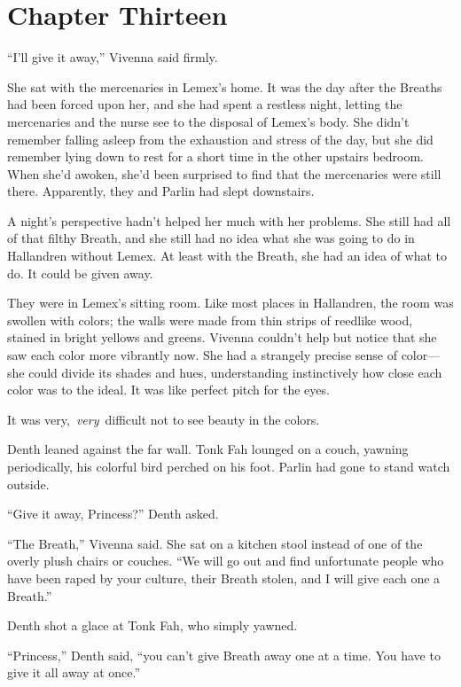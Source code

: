 \section{Chapter Thirteen}

“I’ll give it away,” Vivenna said firmly.

She sat with the mercenaries in Lemex’s home. It was the day after the Breaths had been forced upon her, and she had spent a restless night, letting the mercenaries and the nurse see to the disposal of Lemex’s body. She didn’t remember falling asleep from the exhaustion and stress of the day, but she did remember lying down to rest for a short time in the other upstairs bedroom. When she’d awoken, she’d been surprised to find that the mercenaries were still there. Apparently, they and Parlin had slept downstairs.

A night’s perspective hadn’t helped her much with her problems. She still had all of that filthy Breath, and she still had no idea what she was going to do in Hallandren without Lemex. At least with the Breath, she had an idea of what to do. It could be given away.

They were in Lemex’s sitting room. Like most places in Hallandren, the room was swollen with colors; the walls were made from thin strips of reedlike wood, stained in bright yellows and greens. Vivenna couldn’t help but notice that she saw each color more vibrantly now. She had a strangely precise sense of color—she could divide its shades and hues, understanding instinctively how close each color was to the ideal. It was like perfect pitch for the eyes.

It was very,~\textit{very}~difficult not to see beauty in the colors.

Denth leaned against the far wall. Tonk Fah lounged on a couch, yawning periodically, his colorful bird perched on his foot. Parlin had gone to stand watch outside.

“Give it away, Princess?” Denth asked.

“The Breath,” Vivenna said. She sat on a kitchen stool instead of one of the overly plush chairs or couches. “We will go out and find unfortunate people who have been raped by your culture, their Breath stolen, and I will give each one a Breath.”

Denth shot a glace at Tonk Fah, who simply yawned.

“Princess,” Denth said, “you can’t give Breath away one at a time. You have to give it all away at once.”

